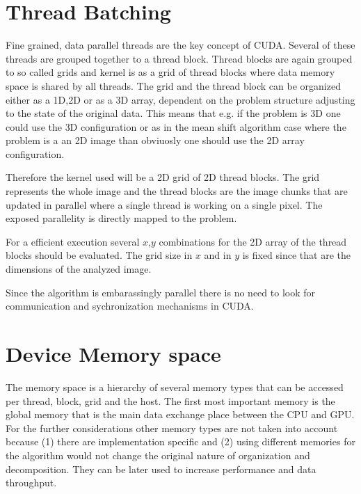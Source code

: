 \section{Thread Batching} %
\label{sec:cuda_thread_hierarchy}

Fine grained, data parallel threads are the key concept of \gls{CUDA}. Several
of these threads are grouped together to a thread block. Thread blocks are again
grouped to so called grids and kernel is as a grid of thread blocks where data 
memory space is shared by all threads. The grid and the thread block can be 
organized either as a \gls{1D},\gls{2D} or as a \gls{3D} array, dependent on 
the problem structure adjusting to the state of the original data. This means 
that e.g. if the problem is \gls{3D} one could use the \gls{3D} configuration or
as in the mean shift algorithm case where the problem is a an \gls{2D} image than
obviuosly one should use the \gls{2D} array configuration.

Therefore the kernel used will be a \gls{2D} grid of \gls{2D} thread blocks. The
grid represents the whole image and the thread blocks are the image chunks that
are updated in parallel where a single thread is working on a single pixel. The 
exposed parallelity is directly mapped to the problem.  

For a efficient execution several $x$,$y$ combinations for the \gls{2D} array of the
thread blocks should be evaluated. The grid size in $x$ and in $y$ is fixed since
that are the dimensions of the analyzed image. 

Since the algorithm is embarassingly parallel there is no need to look for 
communication and sychronization mechanisms in \gls{CUDA}.

\section{Device Memory space} %
\label{sec:cuda_memory}

The memory space is a hierarchy of several memory types that can be accessed per
thread, block, grid and the host. The first most important memory is the global
memory that is the main data exchange place between the \gls{CPU} and \gls{GPU}. 
For the further considerations other memory types are not taken into account 
because (1) there are implementation specific and (2) using different memories
for the algorithm would not change the original nature of organization and
decomposition. They can be later used to increase performance and data throughput. 

